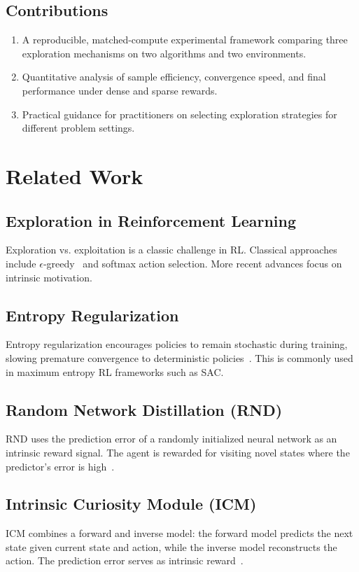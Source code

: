 \documentclass[conference]{IEEEtran}
\begin{document}
\subsection{Contributions}
\begin{enumerate}
  \item A reproducible, matched-compute experimental framework comparing three exploration mechanisms on two algorithms and two environments.
  \item Quantitative analysis of sample efficiency, convergence speed, and final performance under dense and sparse rewards.
  \item Practical guidance for practitioners on selecting exploration strategies for different problem settings.
\end{enumerate}

\section{Related Work}

\subsection{Exploration in Reinforcement Learning}
Exploration vs. exploitation is a classic challenge in RL. Classical approaches include $\epsilon$-greedy~\cite{sutton2018reinforcement} and softmax action selection. More recent advances focus on intrinsic motivation.

\subsection{Entropy Regularization}
Entropy regularization encourages policies to remain stochastic during training, slowing premature convergence to deterministic policies~\cite{ref-placeholder}. This is commonly used in maximum entropy RL frameworks such as SAC.

\subsection{Random Network Distillation (RND)}
RND uses the prediction error of a randomly initialized neural network as an intrinsic reward signal. The agent is rewarded for visiting novel states where the predictor's error is high~\cite{ref-placeholder}.

\subsection{Intrinsic Curiosity Module (ICM)}
ICM combines a forward and inverse model: the forward model predicts the next state given current state and action, while the inverse model reconstructs the action. The prediction error serves as intrinsic reward~\cite{ref-placeholder}.
\end{document}
